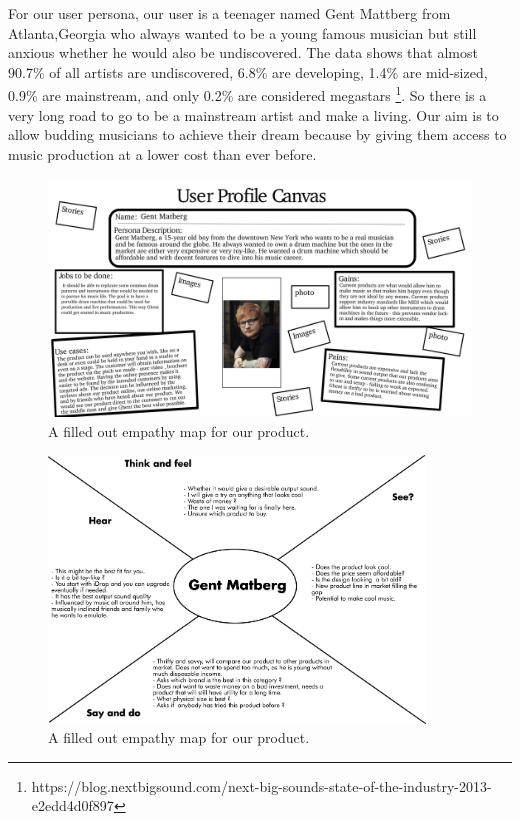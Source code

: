 \documentclass[11pt]{article}
\begin{document}
For our user persona, our user is a teenager named Gent
Mattberg from Atlanta,Georgia who always wanted to be a young famous
musician but still anxious whether he would also be undiscovered. The
data shows that almost 90.7\% of all artists are undiscovered, 6.8\%
are developing, 1.4\% are mid-sized, 0.9\% are mainstream, and only 0.2\%
are considered megastars
\footnote{https://blog.nextbigsound.com/next-big-sounds-state-of-the-industry-2013-e2edd4d0f897}. So
there is a very long road to go to be a mainstream artist and make a
living. Our aim is to allow budding musicians to achieve their dream
because by giving them access to music production at a lower cost than
ever before.


\begin{figure}
\centering
\includegraphics[width=15cm]{./profile_canvas.png}
\caption{\label{fig:orgec983ae}
A filled out empathy map for our product.}
\end{figure}

\newpage


\begin{figure}[H]
\centering
\includegraphics[width=10cm]{./empathy_map.png}
\caption{\label{fig:org2e4a1e3}
A filled out empathy map for our product.}
\end{figure}
\end{document}
